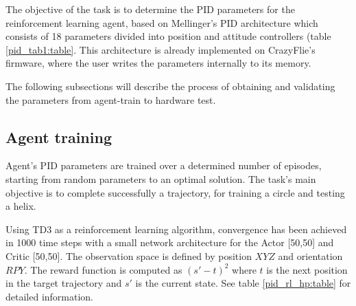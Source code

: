 \documentclass[../final.tex]{subfiles}
\begin{document}
The objective of the task is to determine the PID parameters for the reinforcement learning agent, based on Mellinger's PID architecture which consists of 18 parameters divided into position and attitude controllers (table \ref{pid_tab1:table}. This architecture is already implemented on CrazyFlie's firmware, where the user writes the parameters internally to its memory. 

The following subsections will describe the process of obtaining and validating the parameters from agent-train to hardware test.

\subsection{Agent training}
Agent's PID parameters are trained over a determined number of episodes, starting from random parameters to an optimal solution. The task's main objective is to complete successfully a trajectory, for training a circle and testing a  helix. 

Using TD3 as a reinforcement learning algorithm, convergence has been achieved in  1000 time steps with a small network architecture for the Actor [50,50] and Critic [50,50]. The observation space is defined by position $XYZ$ and orientation $RPY$. The reward function is computed as $(s'-t)^2$ where $t$ is the next position in the target trajectory and $s'$ is the current state. See table \ref{pid_rl_hp:table} for detailed information.
\end{document}
